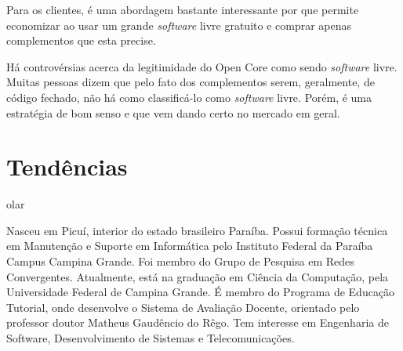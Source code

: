 \documentclass{classe_cn}                 %
\begin{document}
Para os clientes, é uma abordagem bastante interessante por que permite economizar ao usar um grande \textit{software} livre gratuito e comprar apenas complementos que esta precise.

Há controvérsias acerca da legitimidade do Open Core como sendo \textit{software} livre. Muitas pessoas dizem que pelo fato dos complementos serem, geralmente, de código fechado, não há como classificá-lo como \textit{software} livre. Porém, é uma estratégia de bom senso e que vem dando certo no mercado em geral.

\section{Tendências}

olar



\vspace{1.0cm}
  Nasceu em Picuí, interior do estado brasileiro Paraíba. Possui formação técnica em Manutenção e Suporte em Informática pelo Instituto Federal da Paraíba Campus Campina Grande. Foi membro do Grupo de Pesquisa em Redes Convergentes. Atualmente, está na graduação em Ciência da Computação, pela Universidade Federal de Campina Grande. É membro do Programa de Educação Tutorial, onde desenvolve o Sistema de Avaliação Docente, orientado pelo professor doutor Matheus Gaudêncio do Rêgo. Tem interesse em Engenharia de Software, Desenvolvimento de Sistemas e Telecomunicações.
\end{document}

